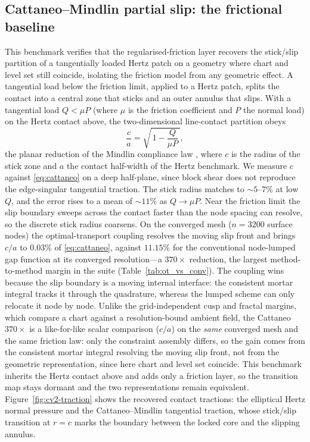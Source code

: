 \documentclass{svjour3}                 %
\begin{document}
\subsection{Cattaneo--Mindlin partial slip: the frictional baseline}\label{sec:ex_cattaneo}

This benchmark verifies that the regularised-friction layer recovers the stick/slip partition of a tangentially
loaded Hertz patch on a geometry where chart and level set still coincide, isolating the friction model from any
geometric effect. A tangential load below the friction limit, applied to a Hertz patch, splits the contact into
a central zone that sticks and an outer annulus that slips. With a tangential load
$Q<\mu P$ (where $\mu$ is the friction coefficient and $P$ the normal load) on the Hertz contact above, the
two-dimensional line-contact partition obeys
%
\begin{equation}\label{eq:cattaneo}
\frac{c}{a} = \sqrt{\,1-\frac{Q}{\mu P}\,},
\end{equation}
%
the planar reduction of the Mindlin compliance law
\citep{mindlin1949compliance,johnson1985contact}, where $c$ is the radius of the stick zone and $a$ the
contact half-width of the Hertz benchmark. We measure $c$ against \eqref{eq:cattaneo} on a deep half-plane, since block
shear does not reproduce the edge-singular tangential traction. The stick radius matches to $\sim
5$--$7\%$ at low $Q$, and the error rises to a mean of $\sim 11\%$ as $Q\to\mu P$. Near the friction
limit the slip boundary sweeps across the contact faster than the node spacing can resolve, so the
discrete stick radius coarsens. On the converged mesh ($n=3200$ surface nodes) the optimal-transport coupling
resolves the moving slip front and brings $c/a$ to $0.03\%$ of \eqref{eq:cattaneo}, against $11.15\%$ for the
conventional node-lumped gap function at its converged resolution---a $370\times$ reduction, the largest
method-to-method margin in the suite (Table~\ref{tab:ot_vs_conv}). The coupling wins because the slip boundary is a moving internal interface: the
consistent mortar integral tracks it through the quadrature, whereas the lumped scheme can only relocate it node
by node. Unlike the grid-independent cusp and fractal margins, which compare a chart against a resolution-bound
ambient field, the Cattaneo $370\times$ is a like-for-like scalar comparison ($c/a$) on the \emph{same} converged
mesh and the same friction law: only the constraint assembly differs, so the gain comes from the
consistent mortar integral resolving the moving slip front, not from the geometric representation, since here
chart and level set coincide. This benchmark inherits the Hertz contact above and adds only a friction layer,
so the transition map stays dormant and the two representations remain equivalent. Figure~\ref{fig:cv2-traction}
shows the recovered contact tractions: the elliptical Hertz normal pressure and the Cattaneo--Mindlin
tangential traction, whose stick/slip transition at $r=c$ marks the boundary between the locked core and
the slipping annulus.
\end{document}
